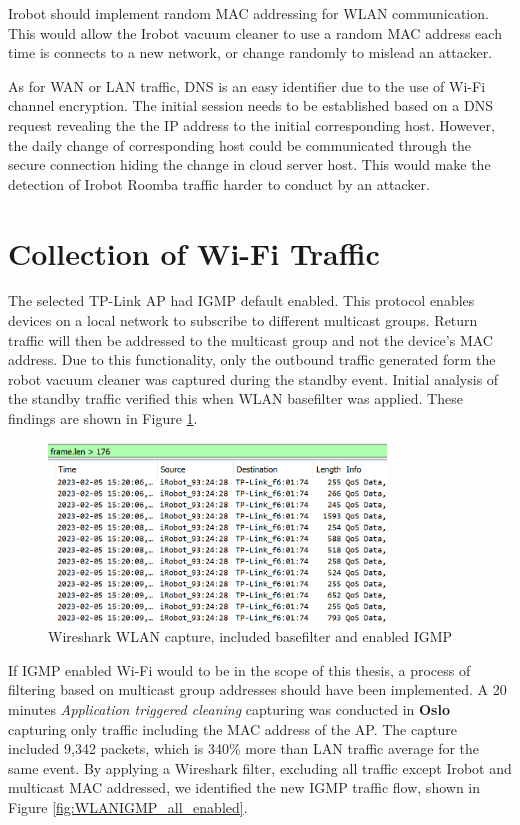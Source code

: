 Irobot should implement random \gls{MAC} addressing \cite{random_mac_bernardos2020rfc} for \gls{WLAN} communication. This would allow the Irobot vacuum cleaner to use a random \gls{MAC} address each time is connects to a new network, or change randomly to mislead an attacker. 

As for \gls{WAN} or \gls{LAN} traffic, \gls{DNS} is an easy identifier due to the use of \gls{Wi-Fi} channel encryption. The initial session needs to be established based on a \gls{DNS} request revealing the the \gls{IP} address to the initial corresponding host. However, the daily change of corresponding host could be communicated through the secure connection hiding the change in cloud server host. This would make the detection of Irobot Roomba traffic harder to conduct by an attacker.

\section{Collection of Wi-Fi Traffic}
The selected TP-Link \gls{AP} had \gls{IGMP} \cite{igmp_rfc2236} default enabled. This protocol enables devices on a local network to subscribe to different multicast groups. Return traffic will then be addressed to the multicast group and not the device's \gls{MAC} address. Due to this functionality, only the outbound traffic generated form the robot vacuum cleaner was captured during the standby event. Initial analysis of the standby traffic verified this when \gls{WLAN} basefilter was applied. These findings are shown in Figure \ref{fig:WLANIGMP_enabled}.

\begin{figure}[H]
    \centering
    \includegraphics[width=0.8\textwidth]{figures/WLAN_IGMP_enabled.png}
    \caption{Wireshark \gls{WLAN} capture, included basefilter and enabled IGMP}
    \label{fig:WLANIGMP_enabled}
\end{figure}

If \gls{IGMP} enabled \gls{Wi-Fi} would to be in the scope of this thesis, a process of filtering based on multicast group addresses should have been implemented. A 20 minutes \textit{Application triggered cleaning} capturing was conducted in \textbf{Oslo} capturing only traffic including the \gls{MAC} address of the AP. The capture included 9,342 packets, which is 340\% more than \gls{LAN} traffic average for the same event. By applying a Wireshark filter, excluding all traffic except Irobot and multicast \gls{MAC} addressed, we identified the new \gls{IGMP} traffic flow, shown in Figure \ref{fig:WLANIGMP_all_enabled}. 

